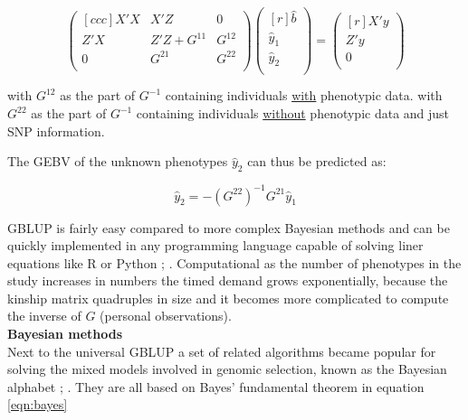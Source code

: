 \begin{equation}
 \begin{pmatrix}[ccc]
  X'X & X'Z & 0 \\ 
  Z'X & Z'Z + G^{11} & G^{12} \\ 
  0 & G^{21} & G^{22} \\ 
 \end{pmatrix}
 \begin{pmatrix}[r]
  \hat{b} \\ 
  \hat{y}_1 \\ 
  \hat{y}_2 \\ 
 \end{pmatrix}
 =
 \begin{pmatrix}[r]
  X'y \\ 
  Z'y \\ 
  0 \\ 
 \end{pmatrix}
 \label{eqn:pBLUP}
\end{equation}

with $G^{12}$ as the part of $G^{-1}$ containing individuals \underline{with} phenotypic data.
with $G^{22}$ as the part of $G^{-1}$ containing individuals \underline{without} phenotypic data and just SNP information. 

The GEBV of the unknown phenotypes $\hat{y}_2$ can thus be predicted as:

\begin{equation}
\hat{y}_2 = -\left( G^{22}\right)^{-1}G^{21}\hat{y}_1
\label{eqn:gpred}
\end{equation}

GBLUP is fairly easy compared to more complex Bayesian methods and can be quickly implemented in any programming
language capable of solving liner equations like R or Python \cite{CRAN}; \cite{van1995python}. Computational as the number of phenotypes in the study
increases in numbers the timed demand grows exponentially, because the kinship matrix quadruples in size and
it becomes more complicated to compute the inverse of $G$ (personal observations). \\

\noindent
\textbf{Bayesian methods} \\ 

Next to the universal GBLUP a set of related algorithms became popular for solving the mixed models involved in genomic selection, known as the Bayesian alphabet \cite{gianola2009}; \cite{gianola2013}. They are all based on Bayes' fundamental theorem in equation \ref{eqn:bayes}

